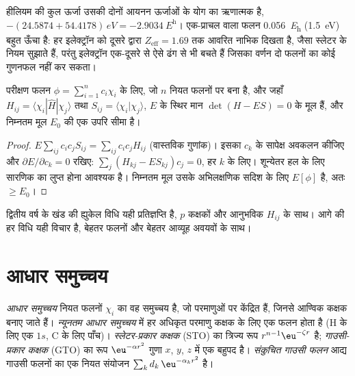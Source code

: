 \begin{example}[यह कितना अच्छा है?]\label{ex:b3:computational-chemistry:helium}
हीलियम की कुल ऊर्जा उसकी दोनों आयनन ऊर्जाओं के योग का ऋणात्मक है,
$-(24.5874 + 54.4178)\,\unit{eV} = \qty{-2.9034}{\hartree}$। एक-प्राचल वाला
फलन \qty{0.056}{\hartree} (\qty{1.5}{eV}) बहुत ऊँचा है: हर इलेक्ट्रॉन को
दूसरे द्वारा $Z_{\mathrm{eff}} = 1.69$ तक आवरित नाभिक दिखता है, जैसा स्लेटर के नियम
सुझाते हैं, परंतु इलेक्ट्रॉन एक-दूसरे से ऐसे ढंग से भी बचते हैं जिसका वर्णन दो
फलनों का कोई गुणनफल नहीं कर सकता।
\end{example}

\begin{proposition}[रैखिक विचरण]\label{prop:b3:computational-chemistry:linear-variation}
परीक्षण फलन $\phi = \sum_{i=1}^n c_i\chi_i$ के लिए, जो $n$ नियत फलनों पर बना है,
और जहाँ $H_{ij} = \langle\chi_i|\hat H|\chi_j\rangle$ तथा $S_{ij} = \langle\chi_i|\chi_j
\rangle$, $E$ के स्थिर मान $\det(H - ES) = 0$ के मूल हैं, और
निम्नतम मूल $E_0$ की एक उपरि सीमा है।
\end{proposition}

\begin{proof}
$E\sum_{ij}c_ic_jS_{ij} = \sum_{ij}c_ic_jH_{ij}$ (वास्तविक गुणांक)। इसका
$c_k$ के सापेक्ष अवकलन कीजिए और $\partial E/\partial c_k = 0$ रखिए: $\sum_j(H_{kj} -
ES_{kj})c_j = 0$, हर $k$ के लिए। शून्येतर हल के लिए सारणिक का
लुप्त होना आवश्यक है। निम्नतम मूल उसके अभिलक्षणिक सदिश के लिए $E[\phi]$ है, अतः $\ge E_0$।
\end{proof}

द्वितीय वर्ष के खंड की ह्युकेल विधि यही प्रतिज्ञप्ति है, $p$
कक्षकों और आनुभविक $H_{ij}$ के साथ। आगे की हर विधि यही विचार है,
बेहतर फलनों और बेहतर आव्यूह अवयवों के साथ।

\section{आधार समुच्चय}

\begin{definition}[आधार समुच्चय, न्यूनतम आधार, स्लेटर- और गाउसी-प्रकार कक्षक]\label{def:b3:computational-chemistry:basis}
\emph{आधार समुच्चय} नियत फलनों $\chi_i$ का वह समुच्चय है,
जो परमाणुओं पर केंद्रित हैं, जिनसे आण्विक कक्षक बनाए जाते हैं।
\emph{न्यूनतम आधार समुच्चय} में हर
अधिकृत परमाणु कक्षक के लिए एक फलन होता है (H के लिए एक $1s$, C के लिए पाँच)।
\emph{स्लेटर-प्रकार कक्षक} (STO) का त्रिज्य रूप
$r^{n-1}\eu^{-\zeta r}$ है; \emph{गाउसी-प्रकार कक्षक}
(GTO) का रूप $\eu^{-\alpha r^2}$ गुणा $x$, $y$,
$z$ में एक बहुपद है। \emph{संकुचित गाउसी फलन}
आद्य गाउसी फलनों का एक नियत संयोजन $\sum_kd_k\,\eu^{-\alpha_kr^2}$ है।
\end{definition}

